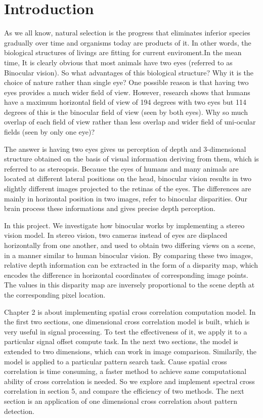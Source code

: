 \chapter{Introduction}\label{part:into}

As we all know, natural selection is the progress that eliminates inferior species gradually over time and organisms today are products of it. In other words, the biological structures of livings are fitting for current enviroment.In the mean time, It is clearly obvious that most animals have two eyes (referred to as Binocular vision). So what advantages of this biological structure? Why it is the choice of nature rather than single eye? One possible reason is that having two eyes provides a much wider field of view. However, research shows that humans have a maximum horizontal field of view of 194 degrees with two eyes but 114 degrees of this is the binocular field of view (seen by both eyes)\cite{Howard1995Binocular}. Why so much overlap of each field of view rather than less overlap and wider field of uni-ocular fields (seen by only one eye)? 

The answer is having two eyes gives us perception of depth and 3-dimensional structure obtained on the basis of visual information deriving from them, which is referred to as stereopsis. Because the eyes of humans and many animals are located at different lateral positions on the head, binocular vision results in two slightly different images projected to the retinas of the eyes. The differences are mainly in horizontal position in two images, refer to binocular disparities. Our brain process these informations and gives precise depth perception.

In this project. We investigate how binocular works by implementing a stereo vision model. In stereo vision, two cameras instead of eyes are displaced horizontally from one another, and used to obtain two differing views on a scene, in a manner similar to human binocular vision. By comparing these two images, relative depth information can be extracted in the form of a disparity map, which encodes the difference in horizontal coordinates of corresponding image points. The values in this disparity map are inversely proportional to the scene depth at the corresponding pixel location.

Chapter 2 is about implementing spatial cross correlation computation model. In the first two sections, one dimensional cross correlation model is built, which is very useful in signal processing.  To test the effectiveness of it, we apply it to a particular signal offset compute task. In the next two sections, the model is extended to two dimensions, which can work in image comparison. Similarily, the model is applied to a particular pattern search task. Cause spatial cross correlation is time consuming,  a faster method to achieve same computational ability of cross correlation is needed. So we explore and implement spectral cross correlation in section 5, and compare the efficiency of two methods. The next section is an application of one dimensional cross correlation about pattern detection. 

